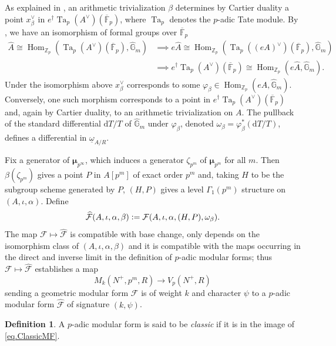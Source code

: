 \documentclass[a4paper]{amsart}
\numberwithin{equation}{section}
\theoremstyle{definition}
\newtheorem{definition}[theorem]{Definition}
\newcommand{\Z}{\mathbb{Z}}
\newcommand{\F}{\mathbb{F}}
\newcommand{\G}{\mathbb{G}}
\newcommand{\defeq}{\vcentcolon=}
\DeclareMathOperator{\Hom}{Hom}
\DeclareMathOperator{\Ta}{Ta}
\begin{document}
As explained in \cite[\S 3.1]{Magrone}, an arithmetic trivialization  
$\beta$ determines by Cartier duality a point $x_{\beta}^\vee$ in 
$e^\dagger{\Ta_p(A^\vee)({\overline{\F}_p})}$, where $\Ta_p$ denotes the $p$-adic Tate module. By \cite[p. 150]{Katz}, we have an isomorphism of formal groups over $\overline{\F}_p$
\begin{align*}
\widehat{A}\cong\Hom_{\Z_p}(\Ta_p(A^\vee)(\overline{\F}_p),\widehat{\G}_m) &\implies e\widehat{A}\cong\Hom_{\Z_p}(\Ta_p((eA)^\vee)(\overline{\F}_p),\widehat{\G}_m)\\
&\implies e^\dagger{\Ta_p(A^\vee)({\overline{\F}_p})}\cong\Hom_{\Z_p}(e\widehat{A},\widehat{\G}_m).
\end{align*}
Under the isomorphism above $x_\beta^\vee$ corresponds to some $\varphi_{\beta}\in \Hom_{\Z_p}(e\widehat{A},\widehat{\G}_m)$. Conversely, one such morphism corresponds to a point in $e^\dagger{\Ta_p(A^\vee)({\overline{\F}_p})}$ and, again by Cartier duality, to an arithmetic trivialization on $A$. The pullback of the standard differential $\mathrm{d}T/T$ of $\widehat{\G}_m$ under $\varphi_\beta$, denoted $\omega_{\beta} = \varphi_{\beta }^*(\mathrm{d}T/T)$, defines a differential in $\underline{\omega}_{A/R}$.
 
Fix a generator of $\boldsymbol{\mu}_{p^\infty}$, which induces a generator $\zeta_{p^m}$ of $\boldsymbol{\mu}_{p^m}$ for all $m$. Then $\beta (\zeta_{p^m})$ gives a point $P$ in $A[p^m]$ of exact order $p^m$ and, taking $H$ to be the subgroup scheme generated by $P$, $(H,P)$ gives a level $\Gamma_1(p^m)$ structure on $(A,\iota,\alpha)$. Define \[\widehat{\mathcal{F}}(A,\iota,\alpha, \beta  ) \defeq \mathcal{F}(A,\iota,\alpha, (H,P),\omega_{\beta  }).\] The map $\mathcal{F}\mapsto \widehat{\mathcal{F}}$ is compatible with base change, only depends on the isomorphism class of $(A,\iota,\alpha, \beta )$ and it is compatible with the maps occurring in the direct and inverse limit in the definition of $p$-adic modular forms; thus $\mathcal{F}\mapsto \widehat{\mathcal{F}}$ establishes a map 
\begin{equation}\label{eq.ClassicMF}
M_k(N^+,p^m,R)\longrightarrow V_p(N^+,R)
\end{equation}
sending a geometric modular form $\mathcal{F}$ is of weight $k$ and character $\psi$ to a $p$-adic modular form $\widehat{\mathcal{F}}$ of signature $(k,\psi)$.

\begin{definition}
A $p$-adic modular form is said to be \textit{classic} if it is in the image of \eqref{eq.ClassicMF}.
\end{definition}
\end{document}
